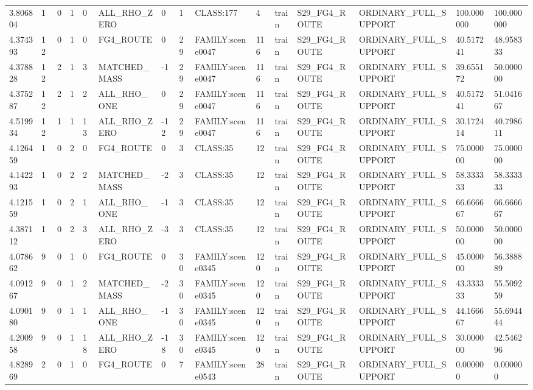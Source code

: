 \begin{tabular}{lllllllllllllll}
3.806804 & 1 & 0 & 1 & 0 & ALL\_RHO\_ZERO & 0 & 1 & CLASS:177 & 4 & train & S29\_FG4\_ROUTE & ORDINARY\_FULL\_SUPPORT & 100.000000 & 100.000000 \\
4.374393 & 12 & 0 & 1 & 0 & FG4\_ROUTE & 0 & 29 & FAMILY:scene0047 & 116 & train & S29\_FG4\_ROUTE & ORDINARY\_FULL\_SUPPORT & 40.517241 & 48.958333 \\
4.378828 & 12 & 2 & 1 & 3 & MATCHED\_MASS & -1 & 29 & FAMILY:scene0047 & 116 & train & S29\_FG4\_ROUTE & ORDINARY\_FULL\_SUPPORT & 39.655172 & 50.000000 \\
4.375287 & 12 & 2 & 1 & 2 & ALL\_RHO\_ONE & 0 & 29 & FAMILY:scene0047 & 116 & train & S29\_FG4\_ROUTE & ORDINARY\_FULL\_SUPPORT & 40.517241 & 51.041667 \\
4.519934 & 12 & 1 & 1 & 13 & ALL\_RHO\_ZERO & -12 & 29 & FAMILY:scene0047 & 116 & train & S29\_FG4\_ROUTE & ORDINARY\_FULL\_SUPPORT & 30.172414 & 40.798611 \\
4.126459 & 1 & 0 & 2 & 0 & FG4\_ROUTE & 0 & 3 & CLASS:35 & 12 & train & S29\_FG4\_ROUTE & ORDINARY\_FULL\_SUPPORT & 75.000000 & 75.000000 \\
4.142293 & 1 & 0 & 2 & 2 & MATCHED\_MASS & -2 & 3 & CLASS:35 & 12 & train & S29\_FG4\_ROUTE & ORDINARY\_FULL\_SUPPORT & 58.333333 & 58.333333 \\
4.121559 & 1 & 0 & 2 & 1 & ALL\_RHO\_ONE & -1 & 3 & CLASS:35 & 12 & train & S29\_FG4\_ROUTE & ORDINARY\_FULL\_SUPPORT & 66.666667 & 66.666667 \\
4.387112 & 1 & 0 & 2 & 3 & ALL\_RHO\_ZERO & -3 & 3 & CLASS:35 & 12 & train & S29\_FG4\_ROUTE & ORDINARY\_FULL\_SUPPORT & 50.000000 & 50.000000 \\
4.078662 & 9 & 0 & 1 & 0 & FG4\_ROUTE & 0 & 30 & FAMILY:scene0345 & 120 & train & S29\_FG4\_ROUTE & ORDINARY\_FULL\_SUPPORT & 45.000000 & 56.388889 \\
4.091267 & 9 & 0 & 1 & 2 & MATCHED\_MASS & -2 & 30 & FAMILY:scene0345 & 120 & train & S29\_FG4\_ROUTE & ORDINARY\_FULL\_SUPPORT & 43.333333 & 55.509259 \\
4.090180 & 9 & 0 & 1 & 1 & ALL\_RHO\_ONE & -1 & 30 & FAMILY:scene0345 & 120 & train & S29\_FG4\_ROUTE & ORDINARY\_FULL\_SUPPORT & 44.166667 & 55.694444 \\
4.200958 & 9 & 0 & 1 & 18 & ALL\_RHO\_ZERO & -18 & 30 & FAMILY:scene0345 & 120 & train & S29\_FG4\_ROUTE & ORDINARY\_FULL\_SUPPORT & 30.000000 & 42.546296 \\
4.828969 & 2 & 0 & 1 & 0 & FG4\_ROUTE & 0 & 7 & FAMILY:scene0543 & 28 & train & S29\_FG4\_ROUTE & ORDINARY\_FULL\_SUPPORT & 0.000000 & 0.000000 \\

\end{tabular}
